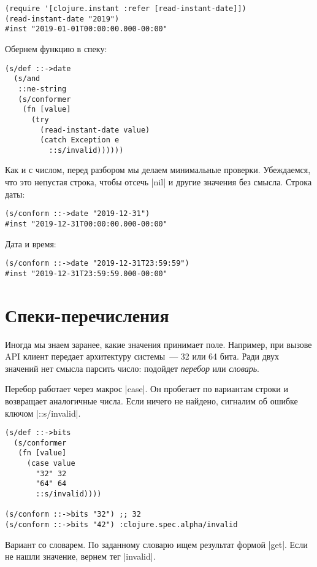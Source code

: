 \begin{verbatim}
(require '[clojure.instant :refer [read-instant-date]])
(read-instant-date "2019")
#inst "2019-01-01T00:00:00.000-00:00"
\end{verbatim}

Обернем функцию в спеку:

\begin{verbatim}
(s/def ::->date
  (s/and
   ::ne-string
   (s/conformer
    (fn [value]
      (try
        (read-instant-date value)
        (catch Exception e
          ::s/invalid))))))
\end{verbatim}

Как и с числом, перед разбором мы делаем минимальные проверки. Убеждаемся, что
это непустая строка, чтобы отсечь \spverb|nil| и другие значения без
смысла. Строка даты:

\begin{verbatim}
(s/conform ::->date "2019-12-31")
#inst "2019-12-31T00:00:00.000-00:00"
\end{verbatim}

\noindent
Дата и время:

\begin{verbatim}
(s/conform ::->date "2019-12-31T23:59:59")
#inst "2019-12-31T23:59:59.000-00:00"
\end{verbatim}

\section{Спеки-перечисления}

Иногда мы знаем заранее, какие значения принимает поле. Например, при вызове API
клиент передает архитектуру системы~--- 32 или 64 бита. Ради двух значений нет
смысла парсить число: подойдет \emph{перебор} или \emph{словарь}.

Перебор работает через макрос \spverb|case|. Он пробегает по вариантам строки и
возвращает аналогичные числа. Если ничего не найдено, сигналим об ошибке ключом
\spverb|::s/invalid|.

\begin{verbatim}
(s/def ::->bits
  (s/conformer
   (fn [value]
     (case value
       "32" 32
       "64" 64
       ::s/invalid))))

(s/conform ::->bits "32") ;; 32
(s/conform ::->bits "42") :clojure.spec.alpha/invalid
\end{verbatim}

Вариант со словарем. По заданному словарю ищем результат формой
\spverb|get|. Если не нашли значение, вернем тег \spverb|invalid|.

